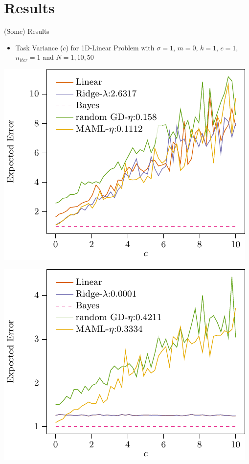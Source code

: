\documentclass[aspectratio=169]{beamer}
\begin{document}
\section{Results}
\begin{frame}{(Some) Results}
  {
    \begin{itemize}
      \item Task Variance ($c$) for 1D-Linear Problem with $\sigma = 1$,
        $m = 0$, $k = 1$, $c = 1$, $n_{iter} = 1$ and $N=1, 10, 50$ %
    \end{itemize}
    \centering
    \begin{minipage}{0.3\textwidth}
      \includegraphics[width=\textwidth]{figures/lin_c_1}    
    \end{minipage}%
    \begin{minipage}{0.3\textwidth}
      \includegraphics[width=\textwidth]{figures/lin_c_2}    

\end{minipage}}
\end{frame}
\end{document}
